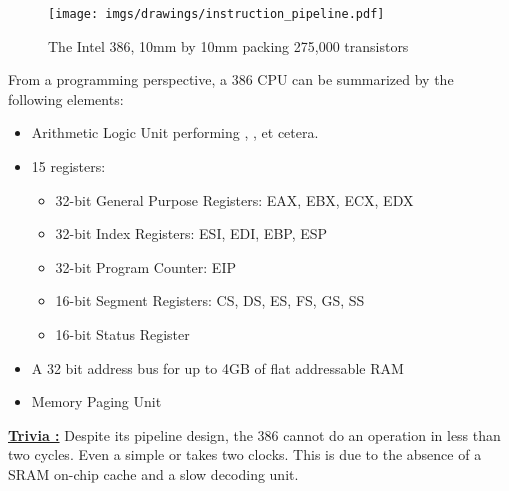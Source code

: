 \documentclass[book.tex]{subfiles}
\begin{document}
\begin{figure}[H]
\centering
\texttt{[image: imgs/drawings/instruction\_pipeline.pdf]}\\
\end{figure}
\par
\begin{figure}[H]
\centering
{}
\caption{The Intel 386, 10mm by 10mm packing 275,000 transistors}
\end{figure}
\par
From a programming perspective, a 386 CPU can be summarized by the following elements:
\begin{itemize}
\item Arithmetic Logic Unit performing , ,  et cetera.
\item 15 registers:
\begin{itemize}
  \item 32-bit General Purpose Registers: EAX, EBX, ECX, EDX
  \item 32-bit Index Registers: ESI, EDI, EBP, ESP
  \item 32-bit Program Counter: EIP
  \item 16-bit Segment Registers: CS, DS, ES, FS, GS, SS
  \item 16-bit Status Register
\end{itemize}
\item A 32 bit address bus for up to 4GB of flat addressable RAM
\item Memory Paging Unit
\end{itemize}
 \par
 \textbf{\underline{Trivia :}} Despite its pipeline design, the 386 cannot do an operation in less than two cycles. Even a simple  or  takes two clocks. This is due to the absence of a SRAM on-chip cache and a slow decoding unit.\\
 \par
 
\end{document}
